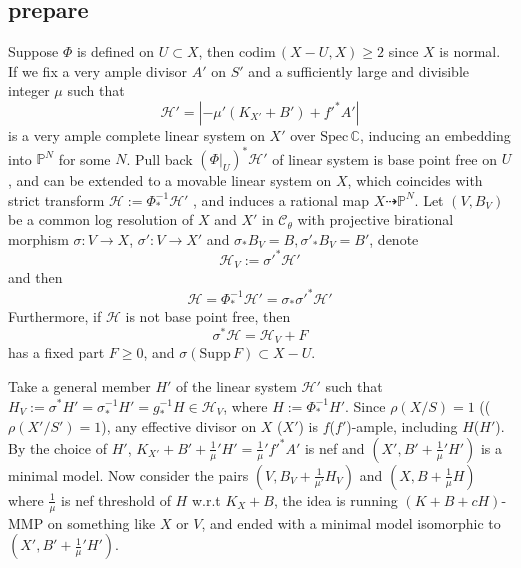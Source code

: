 \documentclass{article}
\begin{document}
\subsection{prepare}

Suppose $ \Phi $ is defined on $ U\subset X $, then $ \mathrm{codim}\,(X-U,X)\geqslant 2 $ since $ X $ is normal. If we fix a very ample divisor $ A'  $ on $ S' $ and a sufficiently large and divisible integer $ \mu $ such that 
$$ \mathcal{H}'=|-\mu' (K_{X'}+B') +f'^*A'| $$
is a very ample complete linear system on $ X' $ over $ \mathrm{Spec}\,\mathbb{C} $,  inducing an embedding into $ \mathbb{P}^N $ for some $ N $. Pull back $ (\Phi|_U)^*\mathcal{H}' $ of linear system is base point free on $ U $, and can be extended  to a movable linear system on $ X $, which coincides with strict transform $ \mathcal{H}:=\Phi^{-1}_*\mathcal{H}' $ , and induces a rational map $ X\dashrightarrow \mathbb{P}^N $. Let $ (V,B_V) $ be a common log resolution of $ X $ and $ X' $ in $ \mathcal{C}_\theta $ with projective birational morphism $ \sigma:V\to X$,   $\sigma':V\to X' $ and $\sigma_*B_V=B, \sigma'_*B_V=B' $, denote
$$ \mathcal{H}_V:=\sigma'^*\mathcal{H}' $$
and then 
$$ \mathcal{H}=\Phi^{-1}_*\mathcal{H}'=\sigma_*\sigma'^*\mathcal{H}' $$
Furthermore, if $ \mathcal{H} $ is not base point free, then
$$ \sigma^*\mathcal{H}=\mathcal{H}_V+F $$
has a fixed part $ F\geqslant0 $, and $ \sigma(\mathrm{Supp}\,F)\subset X-U $. 

Take a general member $ H' $ of the linear system $ \mathcal{H}' $ such that $ H_V:=\sigma^*H'=\sigma^{-1}_*H'=g^{-1}_*H\in \mathcal{H}_V $, where $ H:=\Phi^{-1}_*H' $. Since $ \rho(X/S)=1 $ (($\rho( X'/S')=1 $), any effective divisor on $ X $ ($ X' $) is $ f $($ f' $)-ample, including $ H $($ H' $). 
By the choice of $ H' $,  $ K_{X'}+B'+\frac{1}{\mu}'H'=\frac{1}{\mu}'f'^*A' $ is nef and $ (X',B'+\frac{1}{\mu}'H') $ is a minimal model. Now consider the pairs $ (V,B_V+\frac{1}{\mu'}H_V) $ and $ (X,B+\frac{1}{\mu} H) $ where $ \frac{1}{\mu} $ is nef threshold of $ H $ w.r.t $ K_X+B $, the idea is running $ (K+B+cH) $-MMP on something like $ X $ or $ V $, and ended with a minimal model isomorphic to $ (X',B'+\frac{1}{\mu}'H') $.
\end{document}

